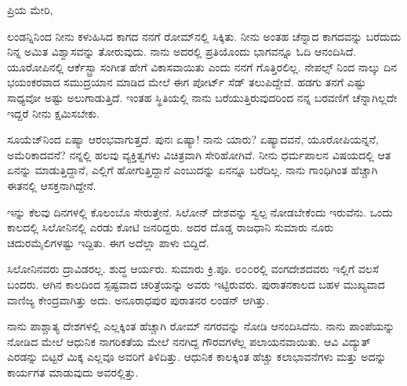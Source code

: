 \noindent
ಪ್ರಿಯ ಮೇರಿ,

ಲಂಡನ್ನಿನಿಂದ ನೀನು ಕಳುಹಿಸಿದ ಕಾಗದ ನನಗೆ ರೋಮ್‌ನಲ್ಲಿ ಸಿಕ್ಕಿತು. ನೀನು ಅಂತಹ ಚೆನ್ನಾದ ಕಾಗದವನ್ನು ಬರೆದುದು ನಿನ್ನ ಅಮಿತ ವಿಶ್ವಾಸವನ್ನು ತೋರುವುದು. ನಾನು ಅದರಲ್ಲಿ ಪ್ರತಿಯೊಂದು ಭಾಗವನ್ನೂ ಓದಿ ಆನಂದಿಸಿದೆ. ಯೂರೋಪಿನಲ್ಲಿ ಆರ್ಕೆಸ್ಟ್ರಾ ಸಂಗೀತ ಹೇಗೆ ವಿಕಾಸವಾಯಿತು ಎಂದು ನನಗೆ ಗೊತ್ತಿರಲಿಲ್ಲ. ನೇಪಲ್ಸ್ ನಿಂದ ನಾಲ್ಕು ದಿನ ಭಯಂಕರವಾದ ಸಮುದ್ರಯಾನ ಮಾಡಿದ ಮೇಲೆ ಈಗ ಪೋರ್ಟ್ ಸೆಡ್ ತಲುಪಿದ್ದೇವೆ. ಹಡಗು ತನಗೆ ಎಷ್ಟು ಸಾಧ್ಯವೋ ಅಷ್ಟು ಅಲುಗಾಡುತ್ತಿದೆ. ಇಂತಹ ಸ್ಥಿತಿಯಲ್ಲಿ ನಾನು ಬರೆಯುತ್ತಿರುವುದರಿಂದ ನನ್ನ ಬರವಣಿಗೆ ಚೆನ್ನಾಗಿಲ್ಲದೇ ಇದ್ದರೆ ನೀನು ಕ್ಷಮಿಸಬೇಕು.

ಸೂಯೆಜ್‌ನಿಂದ ಏಷ್ಯಾ ಆರಂಭವಾಗುತ್ತದೆ. ಪುನಃ ಏಷ್ಯಾ! ನಾನು ಯಾರು? ಏಷ್ಯಾದವನೆ, ಯೂರೋಪಿಯನ್ನನೆ, ಅಮೆರಿಕಾದವನೆ? ನನ್ನಲ್ಲಿ ಹಲವು ವ್ಯಕ್ತಿತ್ವಗಳು ವಿಚಿತ್ರವಾಗಿ ಸೇರಿಹೋಗಿವೆ. ನೀನು ಧರ್ಮಪಾಲನ ವಿಷಯದಲ್ಲಿ ಆತ ಏನನ್ನು ಮಾಡುತ್ತಿದ್ದಾನೆ, ಎಲ್ಲಿಗೆ ಹೋಗುತ್ತಿದ್ದಾನೆ ಎಂಬುದನ್ನು ಏನನ್ನೂ ಬರೆದಿಲ್ಲ. ನಾನು ಗಾಂಧಿಗಿಂತ ಹೆಚ್ಚಾಗಿ ಈತನಲ್ಲಿ ಆಸಕ್ತನಾಗಿದ್ದೇನೆ.

ಇನ್ನು ಕೆಲವು ದಿನಗಳಲ್ಲಿ ಕೊಲಂಬೊ ಸೇರುತ್ತೇನೆ. ಸಿಲೋನ್ ದೇಶವನ್ನು ಸ್ವಲ್ಪ ನೋಡಬೇಕೆಂದು ಇರುವೆನು. ಒಂದು ಕಾಲದಲ್ಲಿ ಸಿಲೋನಿನಲ್ಲಿ ಎರಡು ಕೋಟಿ ಜನರಿದ್ದರು. ಅದರ ದೊಡ್ಡ ರಾಜಧಾನಿ ಸುಮಾರು ನೂರು ಚದುರಮೈಲಿಗಳಷ್ಟು ಇದ್ದಿತು. ಈಗ ಅದೆಲ್ಲಾ ಪಾಳು ಬಿದ್ದಿದೆ.

ಸಿಲೋನಿನವರು ದ್ರಾವಿಡರಲ್ಲ. ಶುದ್ಧ ಆರ್ಯರು. ಸುಮಾರು ಕ್ರಿ.ಪೂ. ೮೦೦ರಲ್ಲಿ ವಂಗದೇಶದವರು ಇಲ್ಲಿಗೆ ವಲಸೆ ಬಂದರು. ಆಗಿನ ಕಾಲದಿಂದ ಸ್ಪಷ್ಟವಾದ ಚರಿತ್ರೆಯನ್ನು ಅವರು ಇಟ್ಟಿರುವರು. ಪುರಾತನಕಾಲದ ಬಹಳ ಮುಖ್ಯವಾದ ವಾಣಿಜ್ಯ ಕೇಂದ್ರವಾಗಿತ್ತು ಅದು. ಅನೂರಾಧಪುರ ಪುರಾತನರ ಲಂಡನ್ ಆಗಿತ್ತು.

ನಾನು ಪಾಶ್ಚಾತ್ಯ ದೇಶಗಳಲ್ಲಿ ಎಲ್ಲಕ್ಕಿಂತ ಹೆಚ್ಚಾಗಿ ರೋಮ್ ನಗರವನ್ನು ನೋಡಿ ಆನಂದಿಸಿದೆನು. ನಾನು ಪಾಂಪೆಯನ್ನು ನೋಡಿದ ಮೇಲೆ ಆಧುನಿಕ ನಾಗರಿಕತೆಯ ಮೇಲೆ ನನಗಿದ್ದ ಗೌರವಗಳೆಲ್ಲ ಪಲಾಯನವಾಯಿತು. ಆವಿ ವಿದ್ಯುತ್ ಎರಡನ್ನು ಬಿಟ್ಟರೆ ಮಿಕ್ಕ ಎಲ್ಲವೂ ಅವರಿಗೆ ತಿಳಿದಿತ್ತು. ಆಧುನಿಕ ಕಾಲಕ್ಕಿಂತ ಹೆಚ್ಚು ಕಲಾಭಾವನೆಗಳು ಮತ್ತು ಅದನ್ನು ಕಾರ್ಯಗತ ಮಾಡುವುದು ಅವರಲ್ಲಿತ್ತು.

{\fontsize{12.6pt}{13.5pt}\selectfont{ಗ್ರೀಕರಲ್ಲಿದ್ದಂತೆ ಮಾನವ ಆಕೃತಿಗಳನ್ನು ಕೊರೆಯುವ ಕಲೆ ಭಾರತದಲ್ಲಿ ಬೆಳೆಯಲಿಲ್ಲ ಎಂದು ನಾನು ಹೇಳಿದ್ದು ಸರಿಯಲ್ಲವೆಂದು ಮಿಸ್ ಲಾಕ್‌ಗೆ ದಯವಿಟ್ಟು ತಿಳಿಸು. ಈ ವಿಷಯದಲ್ಲಿ ಅಧಿಕಾರವಾಣಿಯಿಂದ ಬರೆದಿರುವ ಫರ್ಗುಸನ್ ಮತ್ತು ಇತರರ ಗ್ರಂಥಗಳನ್ನು ನಾನು ಓದುತ್ತಿದ್ದೆ. ಅವರು ಒರಿಸ್ಸಾ ಅಥವಾ ಜಗನ್ನಾಥದ ರುವ ಪಾಳು ಕಟ್ಟಡಗಳಲ್ಲಿ ಕೆಲವು ಕಲ್ಲಿನಂತೆ ಕೊರೆದ ಮಾನವಾಕೃತಿಗಳಿರುವುವು ಎಂದೂ ಸೌಂದರ್ಯ ಮತ್ತು ಅಂಗರಚನಾ ಕೌಶಲ್ಯದ ದೃಷ್ಟಿಯಿಂದ ಅವುಗಳನ್ನು ಗ್ರೀಕ್ ದೇಶದ ಯಾವ ಕೃತಿಯೊಂದಿಗೆ ಬೇಕಾದರೂ ಹೋಲಿಸಬಹುದು ಎಂದೂ ಹೇಳುತ್ತಾರೆ. ಅಲ್ಲಿ ಮೃತ್ಯುವಿನ ಒಂದು ಭೀಮಾಕಾರದ ವಿಗ್ರಹವಿದೆ. ಬಾಡಿಹೋದ ಚರ್ಮದಿಂದ ಆವೃತವಾದ ಸ್ತ್ರೀ ದೇಹದ ಅಸ್ತಿಪಂಜರವಿದೆ. ಅಲ್ಲಿ ಕಾಣುವ ಸೂಕ್ಷ್ಮ ಅಂಗರಚನೆಯ ಸಹಜಸ್ಥಿತಿ ಭೀಕರವಾಗಿದೆ ಮತ್ತು ಜುಗುಪ್ಸೆಯನ್ನು ಹುಟ್ಟಿಸುವಂತಿದೆ. ಅಲ್ಲಿ ಒಂದು ಕಡೆ ಕಾಣುವ ಸ್ತ್ರೀಯ ವಿಗ್ರಹ ವೀನಸ್‌ ಡಿ ಮೆಡೀಸಿಯಂತೆ ಇದೆ ಎನ್ನುತ್ತಾರೆ ನನ್ನ ಗ್ರಂಥಕರ್ತರು. ಆದರೆ ಇದನ್ನು ನೀನು ನೆನಪಿನಲ್ಲಿಡಬೇಕು. ಹೆಚ್ಚು ಕಡಿಮೆ ಪ್ರತಿಯೊಂದನ್ನೂ, ವಿಗ್ರಹದ್ವೇಷಿಗಳಾದ ಮಹಮ್ಮದೀಯರು ಧ್ವಂಸಮಾಡಿರುವರು. ಆದರೂ ಏನು ಉಳಿದಿರುವುದೋ ಅದು ಐರೋಪ್ಯ ಪಾಳುಗಳ ಮೊತ್ತಕ್ಕಿಂತಲೂ ಅಧಿಕವಾಗುವುದು. ನಾನು ಎಂಟು ವರುಷಗಳು ಸಂಚಾರ ಮಾಡಿರುವೆನು. ಆದರೆ ಯಾವ ಮಹಾ ಕಲಾಕೃತಿಯನ್ನೂ ನೋಡಲಿಲ್ಲ.}}

